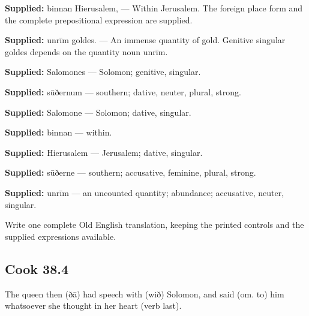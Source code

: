\textbf{Supplied:} binnan Hierusalem, — Within Jerusalem. The foreign place form and the complete prepositional expression are supplied.

\textbf{Supplied:} unrīm goldes. — An immense quantity of gold. Genitive singular goldes depends on the quantity noun unrīm.

\textbf{Supplied:} Salomones — Solomon; genitive, singular.

\textbf{Supplied:} sūðernum — southern; dative, neuter, plural, strong.

\textbf{Supplied:} Salomone — Solomon; dative, singular.

\textbf{Supplied:} binnan — within.

\textbf{Supplied:} Hierusalem — Jerusalem; dative, singular.

\textbf{Supplied:} sūðerne — southern; accusative, feminine, plural, strong.

\textbf{Supplied:} unrīm — an uncounted quantity; abundance; accusative, neuter, singular.

Write one complete Old English translation, keeping the printed controls and the supplied expressions available.

\par\begin{minipage}{\linewidth}\raggedright
\subsection*{Cook 38.4}

The queen then (ðā) had speech with (wið) Solomon, and said (om. to) him whatsoever she thought in her heart (verb last).

\end{minipage}\par\addvspace{4pt}

